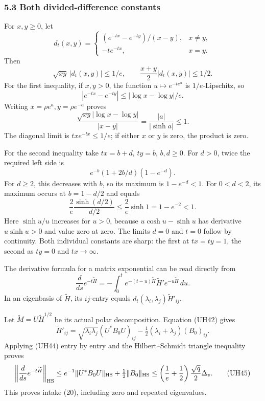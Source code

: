 \documentclass[11pt]{article}
\begin{document}
\subsubsection{5.3 Both divided-difference constants}\label{both-divided-difference-constants}

For \(x,y\ge0\), let \[
 d_t(x,y)=
 \begin{cases}
 (e^{-tx}-e^{-ty})/(x-y),&x\ne y,\\
 -te^{-tx},&x=y.
 \end{cases}
\] Then \[
 \sqrt{xy}\,|d_t(x,y)|\le1/e,\qquad
 \frac{x+y}{2}|d_t(x,y)|\le1/2.
 \tag{UH44}
\] For the first inequality, if \(x,y>0\), the function \(u\mapsto e^{-t e^u}\) is \(1/e\)-Lipschitz, so \[
 |e^{-tx}-e^{-ty}|\le|\log x-\log y|/e.
\] Writing \(x=\rho e^a,y=\rho e^{-a}\) proves \[
 \frac{\sqrt{xy}|\log x-\log y|}{|x-y|}
 =\frac{|a|}{|\sinh a|}\le1.
\] The diagonal limit is \(txe^{-tx}\le1/e\); if either \(x\) or \(y\) is zero, the product is zero.

For the second inequality take \(tx=b+d\), \(ty=b\), \(b,d\ge0\). For \(d>0\), twice the required left side is \[
 e^{-b}(1+2b/d)(1-e^{-d}).
\] For \(d\ge2\), this decreases with \(b\), so its maximum is \(1-e^{-d}<1\). For \(0<d<2\), its maximum occurs at \(b=1-d/2\) and equals \[
 \frac2e\frac{\sinh(d/2)}{d/2}
 \le\frac2e\sinh1=1-e^{-2}<1.
\] Here \(\sinh u/u\) increases for \(u>0\), because \(u\cosh u-\sinh u\) has derivative \(u\sinh u>0\) and value zero at zero. The limits \(d=0\) and \(t=0\) follow by continuity. Both individual constants are sharp: the first at \(tx=ty=1\), the second as \(ty=0\) and \(tx\to\infty\).

The derivative formula for a matrix exponential can be read directly from \[
 \frac d{ds}e^{-t\widetilde H}
 =-\int_0^t e^{-(t-u)\widetilde H}\widetilde H'
                       e^{-u\widetilde H}\,du.
\] In an eigenbasis of \(\widetilde H\), its \(ij\)-entry equals \(d_t(\lambda_i,\lambda_j)\widetilde H'_{ij}\).

Let \(\widetilde M=U\widetilde H^{1/2}\) be its actual polar decomposition. Equation (UH42) gives \[
 \widetilde H'_{ij}
 =\sqrt{\lambda_i\lambda_j}(U^*B_0U)_{ij}
       -\tfrac12(\lambda_i+\lambda_j)(B_0)_{ij}.
\] Applying (UH44) entry by entry and the Hilbert--Schmidt triangle inequality proves \[
 \left\|\frac d{ds}e^{-t\widetilde H}\right\|_{\rm HS}
 \le e^{-1}\|U^*B_0U\|_{\rm HS}+\tfrac12\|B_0\|_{\rm HS}
 \le\left(\frac1e+\frac12\right)\frac{\sqrt q}{2}\Delta_v.
 \tag{UH45}
\] This proves intake (20), including zero and repeated eigenvalues.
\end{document}
